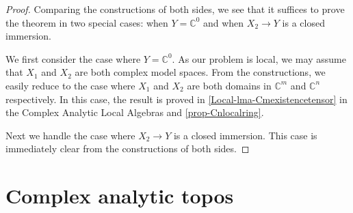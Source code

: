 \begin{proof}
    Comparing the constructions of both sides, we see that it suffices to prove the theorem in two special cases: when $Y=\mathbb{C}^0$ and when $X_2\rightarrow Y$ is a closed immersion. 

    We first consider the case where $Y=\mathbb{C}^0$. As our problem is local, we may assume that $X_1$ and $X_2$ are both complex model spaces. From the constructions, we easily reduce to the case where $X_1$ and $X_2$ are both domains in $\mathbb{C}^m$ and $\mathbb{C}^n$ respectively. In this case, the result is proved in \cref{Local-lma-Cmexistencetensor} in the Complex Analytic Local Algebras and \cref{prop-Cnlocalring}.
    
    Next we handle the case where $X_2\rightarrow Y$ is a closed immersion. This case is immediately clear from the constructions of both sides.
\end{proof}
 
\section{Complex analytic topos}

\printbibliography
